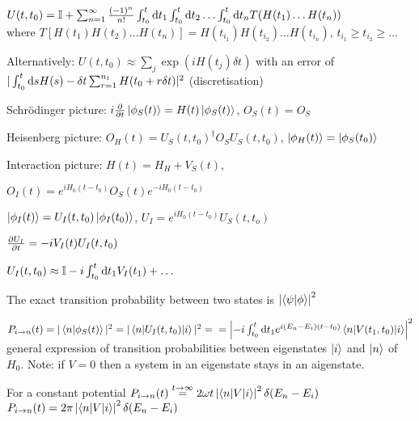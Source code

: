 \begin{squishlist}
    \item $U(t,t_0) = \id + \sum_{n=1}^\infty \frac{(-1)^n}{n!} \int_{t_0}^t \ud t_1 \int_{t_0}^t \ud t_2 \ldots \int_{t_0}^t \ud t_n T(H(t_1)\ldots H(t_n))$\\
    where $T[H(t_1)H(t_2)\ldots H(t_n)] = H(t_{i_1})H(t_{i_2})\ldots H(t_{i_n}),\, t_{i_1} \geq t_{i_2} \geq \ldots$
    \item Alternatively: $U(t,t_0) \approx \sum_j \exp(i H(t_j) \delta t)$ with an error of \\
    $|\int_{t_0}^t \ud s H(s) - \delta t \sum_{r=1}^{n_t} H(t_0 + r \delta t)|^2$ (discretisation)
\end{squishlist}

\begin{squishlist}
    \item Schrödinger picture: $i \D{t}{}\ket{\phi_S(t)} = H(t) \ket{\phi_S(t)}$, \quad $O_S(t) = O_S$
    \item Heisenberg picture: $O_H(t) = U_S(t,t_0)^{\dagger} O_S U_S(t,t_0)$, \quad $\ket{\phi_H(t)} = \ket{\phi_S(t_0)}$
    \item Interaction picture: $H(t) = H_H + V_S(t)$, 
    \item $O_I(t) = e^{iH_0(t-t_0)}O_S(t)e^{-iH_0(t-t_0)}$
    \item $\ket{\phi_I(t)} = U_I(t,t_0) \ket{\phi_I(t_0)}$, \quad $U_I = e^{iH_0(t-t_0)} U_S(t,t_o)$
    \item $\D{t}{U_I} = -i V_I(t) U_I(t,t_0)$
\end{squishlist}

\begin{squishlist}
    \item $U_I(t,t_0) \approx \id -i \int_{t_0}^t \ud t_1 V_I(t_1) + \ldots$
    \item The exact transition probability between two states is $\left| \braket{\psi|\phi} \right| ^2$

    \item $P_{i\rightarrow n}(t) = |\braket{n|\phi_S(t)}|^2 = |\braket{n|U_I(t,t_0)|i}|^2 = \\ 
    = \left| -i \int_{t_0}^t \ud t_1 e^{i(E_n-E_i)(t-t_0)} \braket{n|V(t_1,t_0)|i}\right|^2$ general expression of transition probabilities between eigenstates $\ket{i}$ and $\ket{n}$ of $H_0$. Note: if $V=0$ then a system in an eigenstate stays in an aigenstate.
    
    \item For a constant potential $P_{i\rightarrow n}(t) \overset{t\rightarrow \infty}{=} 2 \omega t \left|\braket{n|V|i}\right|^2 \delta(E_n - E_i)$ \\
    $P_{i\rightarrow n}(t) =2 \pi \left|\braket{n|V|i}\right|^2 \delta(E_n - E_i)$
\end{squishlist}


